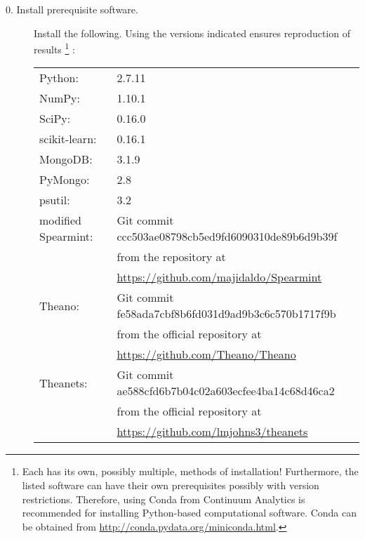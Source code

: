\begin{description}

\item[0. Install prerequisite software.] \hfill

  Install the following.
  Using the versions indicated ensures reproduction of results
  \footnote{
    Each has its own, possibly multiple, methods of installation!
    Furthermore, the listed software can have their own prerequisites possibly with version restrictions.
    Therefore, using \textsf{Conda} from Continuum Analytics is recommended for installing \textsf{Python}-based computational software.
    Conda can be obtained from \url{http://conda.pydata.org/miniconda.html}.
  }%
  :
  
  \begin{tabular}{ll}
    \textsf{Python}:              & 2.7.11 \\
    \textsf{NumPy}:               & 1.10.1 \\
    \textsf{SciPy}:               & 0.16.0 \\
    \textsf{scikit-learn}:        & 0.16.1 \\
    \textsf{MongoDB}:             & 3.1.9 \\
    \textsf{PyMongo}:             & 2.8 \\
    \textsf{psutil}:              & 3.2 \\
    modified \textsf{Spearmint}:  & \textsf{Git} commit ccc503ae08798cb5ed9fd6090310de89b6d9b39f \\
                                  & from the repository at \\ 
                                  & \url{https://github.com/majidaldo/Spearmint} \\
    \textsf{Theano}:              & \textsf{Git} commit fe58ada7cbf8b6fd031d9ad9b3c6c570b1717f9b \\
                                  & from the official repository at \\
                                  & \url{https://github.com/Theano/Theano} \\
    \textsf{Theanets}:            & \textsf{Git} commit ae588cfd6b7b04c02a603ecfee4ba14c68d46ca2 \\
                                  & from the official repository at \\ 
                                  & \url{https://github.com/lmjohns3/theanets}
  \end{tabular}




\end{description}
